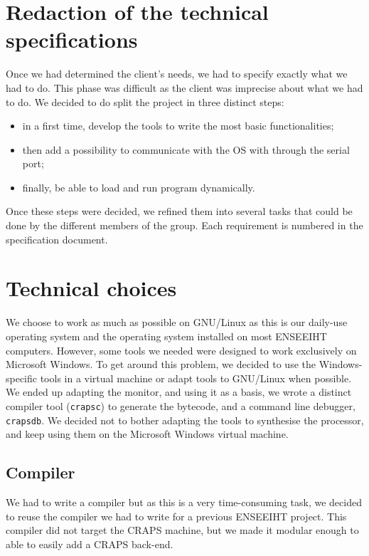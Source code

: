 \documentclass[openany, a4paper]{book}
\begin{document}
    \section{Redaction of the technical specifications}\label{sec:spec}
      Once we had determined the client's needs, we had to specify exactly what
      we had to do. This phase was difficult as the client was imprecise about
      what we had to do. We decided to do split the project in three distinct
      steps:
      \begin{itemize}
        \item in a first time, develop the tools to write the  most basic
            functionalities;
        \item then add a possibility to communicate with the OS with through the
          serial port;
        \item finally, be able to load and run program dynamically.
      \end{itemize}
      Once these steps were decided, we refined them into several tasks that
      could be done by the different members of the group.
      Each requirement is numbered in the specification document.

    \section{Technical choices}
      We choose to work as much as possible on GNU/Linux as this is our
      daily-use operating system and the operating system installed on most
      ENSEEIHT computers.
      However, some tools we needed were designed to work exclusively on
      Microsoft Windows. To get around this problem, we decided to use the
      Windows-specific tools in a virtual machine or adapt tools to GNU/Linux
      when possible. We ended up adapting the monitor, and using it as a basis,
      we wrote a distinct compiler tool (\verb+crapsc+) to generate the
      bytecode, and a command line debugger, \verb+crapsdb+. We decided not to
      bother adapting the tools to synthesise the processor, and keep using them
      on the Microsoft Windows virtual machine.

      \subsection{Compiler}
        We had to write a compiler but as this is a very time-consuming task, we
        decided to reuse the compiler we had to write for a previous ENSEEIHT
        project. This compiler did not target the CRAPS machine, but we made it
        modular enough to able to easily add a CRAPS back-end.
\end{document}
